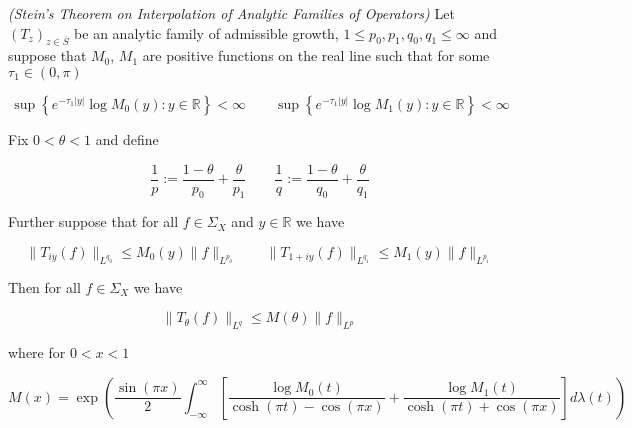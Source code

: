 \begin{mdframed}
	\begin{theorem}\emph{(Stein's Theorem on Interpolation of Analytic Families of Operators)}
		Let $\left( T_z \right)_{z \in \overline{S}}$ be an analytic family of admissible growth, $1 \leq p_0,p_1,q_0,q_1 \leq \infty$ and suppose that $M_0$, $M_1$ are positive functions on the real line such that for some $\tau_1 \in (0,\pi)$

			\begin{equation}
				\sup\left\{e^{-\tau_1 \vert y \vert} \log M_0(y) : y \in \mathbb{R}\right\} < \infty \qquad \sup\left\{e^{-\tau_1 \vert y \vert} \log M_1(y) : y \in \mathbb{R}\right\} < \infty
			\end{equation}

			Fix $0 < \theta < 1$ and define

			\begin{equation}
				\frac{1}{p} := \frac{1 - \theta}{p_0} + \frac{\theta}{p_1} \qquad \frac{1}{q} := \frac{1 - \theta}{q_0} + \frac{\theta}{q_1}
			\end{equation}

			Further suppose that for all $f \in \Sigma_X$ and $y \in \mathbb{R}$ we have

			\begin{equation}
				\|T_{iy}(f)\|_{L^{q_0}} \leq M_0(y)\|f\|_{L^{p_0}} \qquad \|T_{1 + iy}(f)\|_{L^{q_1}} \leq M_1(y)\|f\|_{L^{p_1}} 
			\end{equation}

			Then for all $f \in \Sigma_X$ we have

			\begin{equation*}
				\|T_\theta(f)\|_{L^q} \leq M(\theta)\|f\|_{L^p}
			\end{equation*}

			where for $0 < x < 1$

			\begin{equation*}
				M(x) = \exp\left( \frac{\sin(\pi x)}{2} \int_{-\infty}^\infty \left[ \frac{\log M_0(t)}{\cosh(\pi t) - \cos(\pi x)} + \frac{\log M_1(t)}{\cosh(\pi t) + \cos(\pi x)}\right] d\lambda(t) \right)
			\end{equation*}
	\end{theorem}
\end{mdframed}

